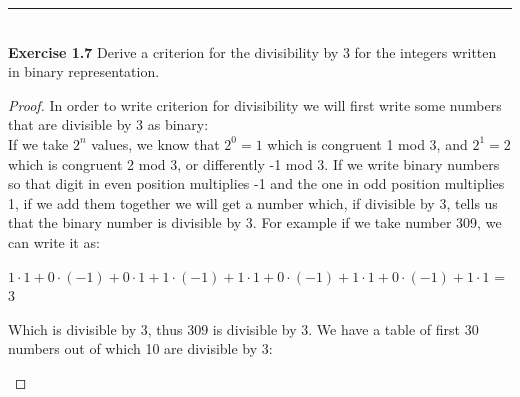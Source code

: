 \documentclass[a4paper]{article}
\begin{document}
\noindent\rule{12cm}{0.4pt}\\
\noindent \textbf{Exercise 1.7} Derive a criterion for the divisibility by 3 for the integers written in binary representation.
\begin{proof}
In order to write criterion for divisibility we will first write some numbers that are divisible by 3 as binary:\\
If we take $2^n$ values, we know that $2^0 = 1$ which is congruent 1 mod 3, and $2^1 = 2$ which is congruent 2 mod 3, or differently -1 mod 3. If we write binary numbers so that digit in even position multiplies -1 and the one in odd position multiplies 1, if we add them together we will get a number which, if divisible by 3, tells us that the binary number is divisible by 3. For example if we take number 309, we can write it as:\\
\begin{center}
$1 \cdot 1 + 0 \cdot (-1) + 0 \cdot 1 + 1 \cdot (-1) + 1 \cdot 1 + 0 \cdot (-1) + 1  \cdot 1 + 0 \cdot (-1) + 1 \cdot 1$ = 3
\end{center} 
Which is divisible by 3, thus 309 is divisible by 3. We have a table of first 30 numbers out of which 10 are divisible by 3: \\
\begin{center}
\centering
{}
\end{center}
\end{proof}
\end{document}
